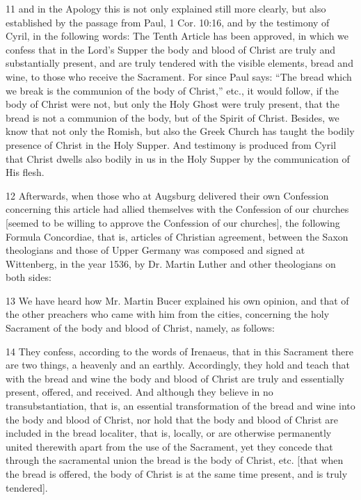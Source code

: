11 and in the Apology this is not only explained still more clearly, but also established by the passage from Paul, 1 Cor. 10:16, and by the testimony of Cyril, in the following words: The Tenth Article has been approved, in which we confess that in the Lord’s Supper the body and blood of Christ are truly and substantially present, and are truly tendered with the visible elements, bread and wine, to those who receive the Sacrament. For since Paul says: “The bread which we break is the communion of the body of Christ,” etc., it would follow, if the body of Christ were not, but only the Holy Ghost were truly present, that the bread is not a communion of the body, but of the Spirit of Christ. Besides, we know that not only the Romish, but also the Greek Church has taught the bodily presence of Christ in the Holy Supper. And testimony is produced from Cyril that Christ dwells also bodily in us in the Holy Supper by the communication of His flesh.

12 Afterwards, when those who at Augsburg delivered their own Confession concerning this article had allied themselves with the Confession of our churches [seemed to be willing to approve the Confession of our churches], the following Formula Concordiae, that is, articles of Christian agreement, between the Saxon theologians and those of Upper Germany was composed and signed at Wittenberg, in the year 1536, by Dr. Martin Luther and other theologians on both sides:

13 We have heard how Mr. Martin Bucer explained his own opinion, and that of the other preachers who came with him from the cities, concerning the holy Sacrament of the body and blood of Christ, namely, as follows:

14 They confess, according to the words of Irenaeus, that in this Sacrament there are two things, a heavenly and an earthly. Accordingly, they hold and teach that with the bread and wine the body and blood of Christ are truly and essentially present, offered, and received. And although they believe in no transubstantiation, that is, an essential transformation of the bread and wine into the body and blood of Christ, nor hold that the body and blood of Christ are included in the bread localiter, that is, locally, or are otherwise permanently united therewith apart from the use of the Sacrament, yet they concede that through the sacramental union the bread is the body of Christ, etc. [that when the bread is offered, the body of Christ is at the same time present, and is truly tendered].


